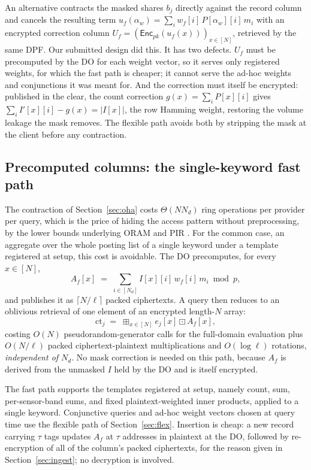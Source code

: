 \documentclass[a4paper,fleqn]{cas-dc}
\newcommand{\Enc}{\mathsf{Enc}}
\newcommand{\bplus}{\boxplus}
\newcommand{\bdot}{\boxdot}
\begin{document}
\begin{remark}
\label{rem:whyenc}
An alternative contracts the masked shares $b_j$ directly against the record
column and cancels the resulting term
$u_f(\alpha_w)=\sum_i w_f[i]\,P[\alpha_w][i]\,m_i$ with an encrypted correction
column $U_f=(\Enc_{pk}(u_f(x)))_{x\in[N]}$, retrieved by the same DPF. Our
submitted design did this. It has two defects. $U_f$ must be precomputed by
the DO for each weight vector, so it serves only registered weights, for which
the fast path is cheaper; it cannot serve the ad-hoc weights and conjunctions
it was meant for. And the correction must itself be encrypted: published in the
clear, the count correction $g(x)=\sum_iP[x][i]$ gives
$\sum_iI'[x][i]-g(x)=|I[x]|$, the row Hamming weight, restoring the volume
leakage the mask removes. The flexible path avoids both by stripping the mask
at the client before any contraction.
\end{remark}

\subsection{Precomputed columns: the single-keyword fast path}
\label{sec:fast}
The contraction of Section~\ref{sec:oha} costs $\Theta(N N_d)$ ring operations
per provider per query, which is the price of hiding the access pattern
without preprocessing, by the lower bounds underlying ORAM and PIR
\citep{goldreich1996software,beimel2000reducing}. For the common case, an
aggregate over the whole posting list of a single keyword under a template
registered at setup, this cost is avoidable. The DO precomputes, for every
$x\in[N]$,
\[
A_f[x] \;=\; \sum_{i\in[N_d]} I[x][i]\,w_f[i]\,m_i \bmod p ,
\]
and publishes it as $\lceil N/\ell\rceil$ packed ciphertexts. A query then
reduces to an oblivious retrieval of one element of an encrypted length-$N$
array:
\[
\text{ct}_j \;=\; \bplus_{x\in[N]} e_j[x]\bdot A_f[x],
\]
costing $O(N)$ pseudorandom-generator calls for the full-domain evaluation
plus $O(N/\ell)$ packed ciphertext-plaintext multiplications and
$O(\log \ell)$ rotations, \emph{independent of $N_d$}. No mask correction is
needed on this path, because $A_f$ is derived from the unmasked $I$ held by
the DO and is itself encrypted.

The fast path supports the templates registered at setup, namely count, sum,
per-sensor-band sums, and fixed plaintext-weighted inner products, applied to
a single keyword. Conjunctive queries and ad-hoc weight vectors chosen at
query time use the flexible path of Section~\ref{sec:flex}. Insertion is
cheap: a new record carrying $\tau$ tags updates $A_f$ at $\tau$ addresses in
plaintext at the DO, followed by re-encryption of all of the column's packed
ciphertexts, for the reason given in Section~\ref{sec:ingest}; no decryption
is involved.
\end{document}
